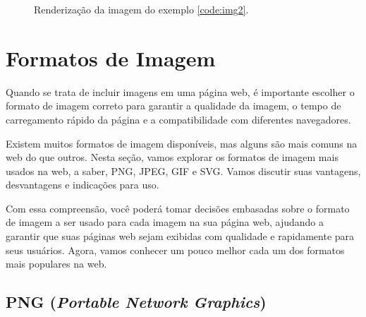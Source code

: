 \begin{figure}[ht!]    
    \caption{Renderização da imagem do exemplo \ref{code:img2}.}
    \label{fig:img2}
\end{figure}

\section{Formatos de Imagem}

Quando se trata de incluir imagens em uma página web, é importante escolher o formato de imagem correto para garantir a qualidade da imagem, o tempo de carregamento rápido da página e a compatibilidade com diferentes navegadores.

Existem muitos formatos de imagem disponíveis, mas alguns são mais comuns na web do que outros. Nesta seção, vamos explorar os formatos de imagem mais usados na web, a saber, PNG, JPEG, GIF e SVG. Vamos discutir suas vantagens, desvantagens e indicações para uso.

Com essa compreensão, você poderá tomar decisões embasadas sobre o formato de imagem a ser usado para cada imagem na sua página web, ajudando a garantir que suas páginas web sejam exibidas com qualidade e rapidamente para seus usuários. Agora, vamos conhecer um pouco melhor cada um dos formatos mais populares na web.

\subsection{PNG (\textit{Portable Network Graphics})}

